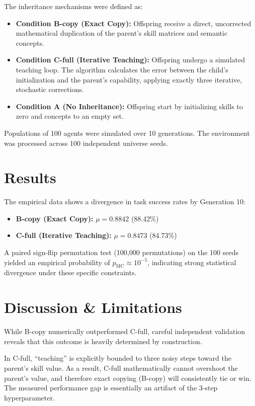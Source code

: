 \documentclass[12pt]{article}
\begin{document}
The inheritance mechanisms were defined as:
\begin{itemize}
    \item \textbf{Condition B-copy (Exact Copy):} Offspring receive a direct, uncorrected mathematical duplication of the parent's skill matrices and semantic concepts.
    \item \textbf{Condition C-full (Iterative Teaching):} Offspring undergo a simulated teaching loop. The algorithm calculates the error between the child's initialization and the parent's capability, applying exactly three iterative, stochastic corrections.
    \item \textbf{Condition A (No Inheritance):} Offspring start by initializing skills to zero and concepts to an empty set.
\end{itemize}

Populations of 100 agents were simulated over 10 generations. The environment was processed across 100 independent universe seeds.

\section{Results}
The empirical data shows a divergence in task success rates by Generation 10:
\begin{itemize}
    \item \textbf{B-copy (Exact Copy):} $\mu = 0.8842$ (88.42\%)
    \item \textbf{C-full (Iterative Teaching):} $\mu = 0.8473$ (84.73\%)
\end{itemize}

A paired sign-flip permutation test (100,000 permutations) on the 100 seeds yielded an empirical probability of $p_{\mathrm{MC}} \approx 10^{-5}$, indicating strong statistical divergence under these specific constraints.

\section{Discussion \& Limitations}
While B-copy numerically outperformed C-full, careful independent validation reveals that this outcome is heavily determined by construction. 

In C-full, ``teaching'' is explicitly bounded to three noisy steps toward the parent's skill value. As a result, C-full mathematically cannot overshoot the parent's value, and therefore exact copying (B-copy) will consistently tie or win. The measured performance gap is essentially an artifact of the 3-step hyperparameter. 
\end{document}
